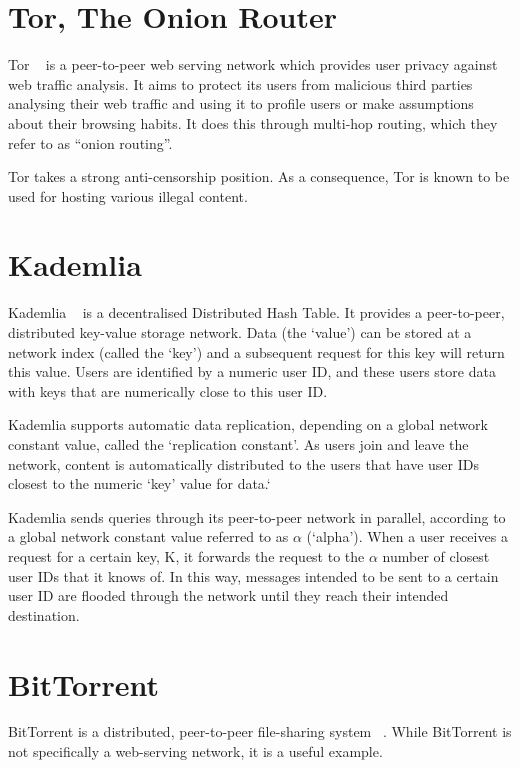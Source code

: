 \section{Tor, The Onion Router}

Tor ~\cite{tor} is a peer-to-peer web serving network which provides user privacy against web traffic analysis.
It aims to protect its users from malicious third parties analysing their web traffic and using it to
profile users or make assumptions about their browsing habits. It does this through multi-hop routing,
which they refer to as “onion routing”.

Tor takes a strong anti-censorship position. As a consequence, Tor is known to be used for hosting various
illegal content.

\section{Kademlia}

Kademlia ~\cite{kademlia} is a decentralised Distributed Hash Table. It provides a peer-to-peer,
distributed key-value storage network. Data (the `value') can be stored at a network index (called the `key')
and a subsequent request for this key will return this value. Users are identified by a numeric user ID, and
these users store data with keys that are numerically close to this user ID.

Kademlia supports automatic data replication, depending on a global network constant value, called the `replication
constant'. As users join and leave the network, content is automatically distributed to the users that have user IDs
closest to the numeric `key' value for data.`

Kademlia sends queries through its peer-to-peer network in parallel, according to a global network constant value
referred to as \(\alpha\) (`alpha'). When a user receives a request for a certain key, K, it forwards the request to the
\(\alpha\) number of closest user IDs that it knows of. In this way, messages intended to be sent to a certain user ID
are flooded through the network until they reach their intended destination.

\section{BitTorrent}

BitTorrent is a distributed, peer-to-peer file-sharing system ~\cite{torrent}. While BitTorrent is not specifically a
web-serving network, it is a useful example.

